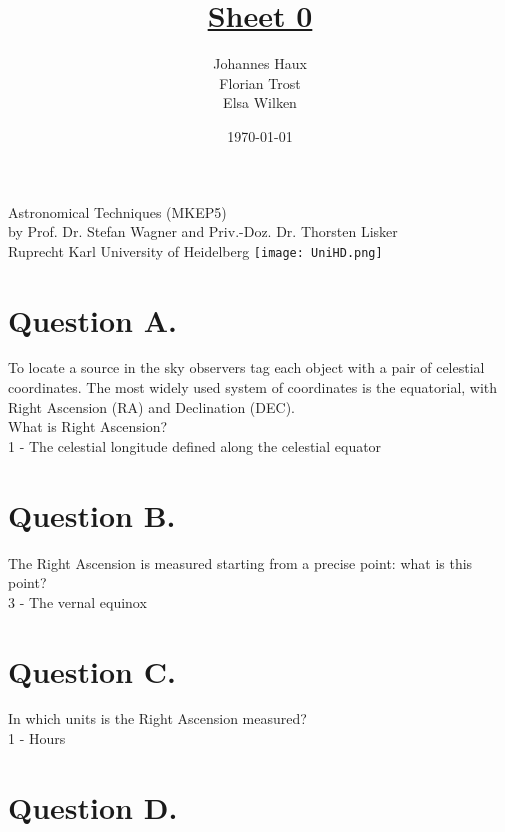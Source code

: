 \documentclass[11pt,a4paper,twoside]{article}
\title{\LARGE \underline {Sheet 0}}
\author{Johannes Haux \\ Florian Trost \\ Elsa Wilken}
\date{\today}
\begin{document}
\maketitle
\thispagestyle{empty}

\begin{center}
  Astronomical Techniques (MKEP5) \\
  \baselineskip35pt
  by Prof. Dr. Stefan Wagner and Priv.-Doz. Dr. Thorsten Lisker \\
  \baselineskip60pt
  Ruprecht Karl University of Heidelberg
\vskip 40pt
\texttt{[image: UniHD.png]}

\end{center}

\newpage
\setcounter{page}{1}		%

\section*{Question A.} 

To locate a source in the sky observers tag each object with a pair of celestial coordinates. The most widely used system of coordinates is the equatorial, with Right Ascension (RA) and Declination (DEC). \\

What is Right Ascension? \\

1 - The celestial longitude defined along the celestial equator

\section*{Question B.}

The Right Ascension is measured starting from a precise point: what is this point? \\

3 - The vernal equinox

\section*{Question C.}

In which units is the Right Ascension measured? \\

1 - Hours

\section*{Question D.}
\end{document}

